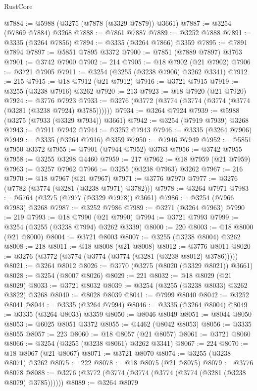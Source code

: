 \begin{lexlean}{RustCore}
\begin{coremodule}
@7884 := @5988 (@3275 (@7878 (@3329 @7879)) @3661)
@7887 := @3254 (@7869 @7884) @3268
@7888 := @7861 @7887
@7889 := @3252 @7888
@7891 := @3335 (@3264 @7856)
@7894 := @3335 (@3264 @7866) @3359
@7895 := @7891 @7894
@7897 := @5851 @7895 @3372
@7900 := @7851 (@7889 @7897) @3763
@7901 := @3742 @7900
@7902 := 214
@7905 := @18 @7902 (@21 @7902)
@7906 := @3721 @7905
@7911 := @3254 (@3255 (@3238 @7906) @3262 @3341)
@7912 := 215
@7915 := @18 @7912 (@21 @7912)
@7916 := @3721 @7915
@7919 := @3255 (@3238 @7916) @3262
@7920 := 213
@7923 := @18 @7920 (@21 @7920)
@7924 := @3776 @7923
@7933 := @3276 (@3772 (@3774 (@3774 (@3774 (@3774 (@3281 (@3238 @7924) @3785))))))
@7934 := @3264 @7924
@7939 := @5988 (@3275 (@7933 (@3329 @7934)) @3661)
@7942 := @3254 (@7919 @7939) @3268
@7943 := @7911 @7942
@7944 := @3252 @7943
@7946 := @3335 (@3264 @7906)
@7949 := @3335 (@3264 @7916) @3359
@7950 := @7946 @7949
@7952 := @5851 @7950 @3372
@7955 := @7901 (@7944 @7952) @3763
@7956 := @3742 @7955
@7958 := @3255 @3298 @4460
@7959 := 217
@7962 := @18 @7959 (@21 @7959)
@7963 := @3257 @7962
@7966 := @3255 (@3238 @7963) @3262
@7967 := 216
@7970 := @18 @7967 (@21 @7967)
@7971 := @3776 @7970
@7977 := @3276 (@7782 (@3774 (@3281 (@3238 @7971) @3782)))
@7978 := @3264 @7971
@7983 := @5764 (@3275 (@7977 (@3329 @7978)) @3661)
@7986 := @3254 (@7966 @7983) @3268
@7987 := @3252 @7986
@7989 := @3271 (@3264 @7963)
@7990 := 219
@7993 := @18 @7990 (@21 @7990)
@7994 := @3721 @7993
@7999 := @3254 (@3255 (@3238 @7994) @3262 @3339)
@8000 := 220
@8003 := @18 @8000 (@21 @8000)
@8004 := @3721 @8003
@8007 := @3255 (@3238 @8004) @3262
@8008 := 218
@8011 := @18 @8008 (@21 @8008)
@8012 := @3776 @8011
@8020 := @3276 (@3772 (@3774 (@3774 (@3774 (@3281 (@3238 @8012) @3786)))))
@8021 := @3264 @8012
@8026 := @3770 (@3275 (@8020 (@3329 @8021)) @3661)
@8028 := @3254 (@8007 @8026)
@8029 := 221
@8032 := @18 @8029 (@21 @8029)
@8033 := @3721 @8032
@8039 := @3254 (@3255 (@3238 @8033) @3262 @3822) @3268
@8040 := @8028 @8039
@8041 := @7999 @8040
@8042 := @3252 @8041
@8044 := @3335 (@3264 @7994)
@8046 := @3335 (@3264 @8004)
@8049 := @3335 (@3264 @8033) @3359
@8050 := @8046 @8049
@8051 := @8044 @8050
@8053 := @6025 @8051 @3372
@8055 := @4462 (@8042 @8053)
@8056 := @3335 @8055
@8057 := 223
@8060 := @18 @8057 (@21 @8057)
@8061 := @3721 @8060
@8066 := @3254 (@3255 (@3238 @8061) @3262 @3341)
@8067 := 224
@8070 := @18 @8067 (@21 @8067)
@8071 := @3721 @8070
@8074 := @3255 (@3238 @8071) @3262
@8075 := 222
@8078 := @18 @8075 (@21 @8075)
@8079 := @3776 @8078
@8088 := @3276 (@3772 (@3774 (@3774 (@3774 (@3774 (@3281 (@3238 @8079) @3785))))))
@8089 := @3264 @8079

\end{coremodule}
\end{lexlean}
